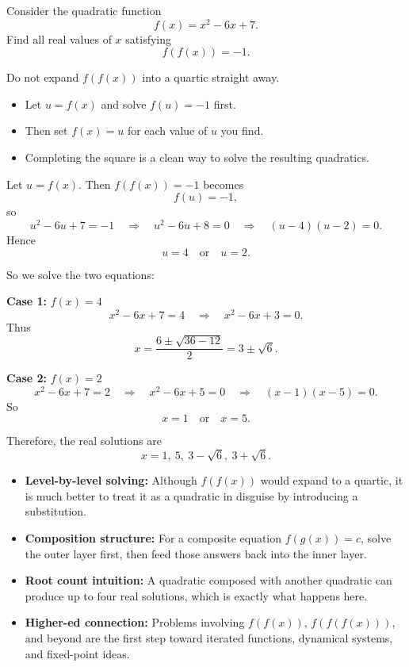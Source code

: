 
\begin{problem}
Consider the quadratic function
\[
f(x)=x^2-6x+7.
\]
Find all real values of $x$ satisfying
\[
f(f(x))=-1.
\]
\end{problem}

\begin{hint}
Do not expand $f(f(x))$ into a quartic straight away.
\begin{itemize}[leftmargin=*]
    \item Let $u=f(x)$ and solve $f(u)=-1$ first.
    \item Then set $f(x)=u$ for each value of $u$ you find.
    \item Completing the square is a clean way to solve the resulting quadratics.
\end{itemize}
\end{hint}

\begin{solution}
Let $u=f(x)$. Then $f(f(x))=-1$ becomes
\[
f(u)=-1,
\]
so
\[
u^2-6u+7=-1
\quad\Longrightarrow\quad
u^2-6u+8=0
\quad\Longrightarrow\quad
(u-4)(u-2)=0.
\]
Hence
\[
u=4 \quad \text{or} \quad u=2.
\]

So we solve the two equations:

\textbf{Case 1:} $f(x)=4$
\[
x^2-6x+7=4
\quad\Longrightarrow\quad
x^2-6x+3=0.
\]
Thus
\[
x=\frac{6\pm\sqrt{36-12}}{2}=3\pm\sqrt6.
\]

\textbf{Case 2:} $f(x)=2$
\[
x^2-6x+7=2
\quad\Longrightarrow\quad
x^2-6x+5=0
\quad\Longrightarrow\quad
(x-1)(x-5)=0.
\]
So
\[
x=1 \quad \text{or} \quad x=5.
\]

Therefore, the real solutions are
\[
\boxed{x=1,\ 5,\ 3-\sqrt6,\ 3+\sqrt6.}
\]
\end{solution}

\begin{takeaways}
    \begin{itemize}[leftmargin=*]
        \item \textbf{Level-by-level solving:} Although $f(f(x))$ would expand to a quartic, it is much better to treat it as a quadratic in disguise by introducing a substitution.
        \item \textbf{Composition structure:} For a composite equation $f(g(x))=c$, solve the outer layer first, then feed those answers back into the inner layer.
        \item \textbf{Root count intuition:} A quadratic composed with another quadratic can produce up to four real solutions, which is exactly what happens here.
        \item \textbf{Higher-ed connection:} Problems involving $f(f(x))$, $f(f(f(x)))$, and beyond are the first step toward iterated functions, dynamical systems, and fixed-point ideas.
    \end{itemize}
\end{takeaways}

